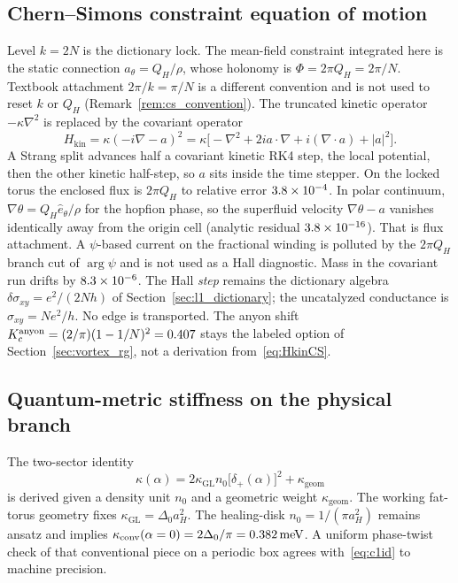 \subsection{Chern--Simons constraint equation of motion}
\label{sec:cs_eom}

Level $k=2N$ is the dictionary lock. The mean-field constraint integrated here is the static connection $a_\theta=Q_H/\rho$, whose holonomy is $\Phi=2\pi Q_H=2\pi/N$. Textbook attachment $2\pi/k=\pi/N$ is a different convention and is not used to reset $k$ or $Q_H$ (Remark~\ref{rem:cs_convention}). The truncated kinetic operator $-\kappa\nabla^2$ is replaced by the covariant operator
\begin{equation}
H_{\mathrm{kin}}=\kappa(-i\nabla-a)^2
=\kappa\bigl[-\nabla^2+2ia\cdot\nabla+i(\nabla\cdot a)+|a|^2\bigr].
\label{eq:HkinCS}
\end{equation}
A Strang split advances half a covariant kinetic RK4 step, the local potential, then the other kinetic half-step, so $a$ sits inside the time stepper. On the locked torus the enclosed flux is $2\pi Q_H$ to relative error $3.8\times 10^{-4}$. In polar continuum, $\nabla\theta=Q_H\hat{e}_\theta/\rho$ for the hopfion phase, so the superfluid velocity $\nabla\theta-a$ vanishes identically away from the origin cell (analytic residual $3.8\times 10^{-16}$). That is flux attachment. A $\psi$-based current on the fractional winding is polluted by the $2\pi Q_H$ branch cut of $\arg\psi$ and is not used as a Hall diagnostic. Mass in the covariant run drifts by $8.3\times 10^{-6}$. The Hall \emph{step} remains the dictionary algebra $\delta\sigma_{xy}=e^2/(2Nh)$ of Section~\ref{sec:l1_dictionary}; the uncatalyzed conductance is $\sigma_{xy}=N e^2/h$. No edge is transported. The anyon shift $K_c^{\mathrm{anyon}}=(2/\pi)(1-1/N)^2=0.407$ stays the labeled option of Section~\ref{sec:vortex_rg}, not a derivation from~\eqref{eq:HkinCS}.

\subsection{Quantum-metric stiffness on the physical branch}
\label{sec:c1_trackb}

The two-sector identity
\begin{equation}
\kappa(\alpha)=2\kappa_{\mathrm{GL}}n_0\bigl[\delta_+(\alpha)\bigr]^2+\kappa_{\mathrm{geom}}
\label{eq:c1id}
\end{equation}
is derived given a density unit $n_0$ and a geometric weight $\kappa_{\mathrm{geom}}$. The working fat-torus geometry fixes $\kappa_{\mathrm{GL}}=\Delta_0 a_H^2$. The healing-disk $n_0=1/(\pi a_H^2)$ remains ansatz and implies $\kappa_{\mathrm{conv}}(\alpha=0)=2\Delta_0/\pi=0.382\,\mathrm{meV}$. A uniform phase-twist check of that conventional piece on a periodic box agrees with~\eqref{eq:c1id} to machine precision.

